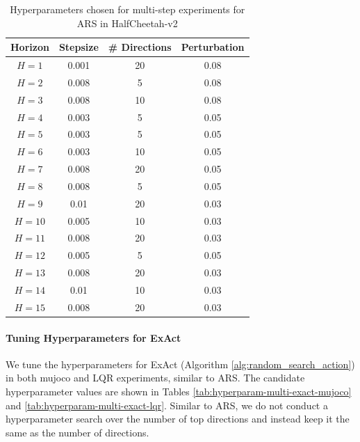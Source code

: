 \begin{table}[ht]
    \centering
    \begin{tabular}{|c|c|c|c|}
    \hline
      \textbf{Horizon} & \textbf{Stepsize} &
                                             \textbf{\#
                                             Directions} &
                                                           \textbf{Perturbation}\\
      \hline
      $H = 1$ & 0.001  & 20 & 0.08 \\
      \hline
      $H = 2$ & 0.008  & 5 &  0.08\\
      \hline
      $H = 3$ &  0.008  & 10 & 0.08 \\
      \hline
      $H = 4$ &  0.003  & 5 &  0.05\\
      \hline
      $H = 5$ &  0.003  & 5 &  0.05\\
      \hline
      $H = 6$ &  0.003  & 10 &  0.05\\
      \hline
      $H = 7$ &  0.008  & 20 &  0.05\\
      \hline
      $H = 8$ &  0.008  & 5 &  0.05\\
      \hline
      $H = 9$ &  0.01  & 20 &  0.03\\
      \hline
      $H = 10$ &   0.005 & 10 &  0.03\\
      \hline
      $H = 11$ &  0.008  & 20 &  0.03\\
      \hline
      $H = 12$ &  0.005  & 5 &  0.05\\
      \hline
      $H = 13$ &  0.008  & 20 &  0.03\\
      \hline
      $H = 14$ &  0.01  & 10 &  0.03\\
      \hline
      $H = 15$ &  0.008  & 20 &  0.03\\
      \hline
    \end{tabular}
    \caption{Hyperparameters chosen for multi-step experiments for ARS
    in HalfCheetah-v2}
    \label{tab:chosen-hyperparam-multi-ars-halfcheetah}
\end{table}


\paragraph{Tuning Hyperparameters for ExAct}
\label{sec:tuning-hyperp-exact}

We tune the hyperparameters for ExAct (Algorithm
\ref{alg:random_search_action}) in both mujoco and LQR experiments,
similar to ARS. The candidate hyperparameter values are shown in
Tables \ref{tab:hyperparam-multi-exact-mujoco} and
\ref{tab:hyperparam-multi-exact-lqr}. Similar to ARS, we do not
conduct a hyperparameter search over the number of top directions and
instead keep it the same as the number of directions.

